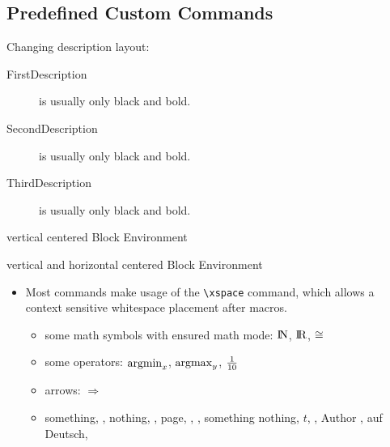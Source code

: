 \documentclass[11pt,a4paper,landscape]{article}
\newcommand*{\nat}{\ensuremath{\rm I\!N}\xspace}
\newcommand*{\rel}{\ensuremath{\rm I\!R}\xspace}
\newcommand*{\argmin}{\ensuremath{\operatornamewithlimits{argmin}}\xspace}
\newcommand*{\argmax}{\ensuremath{\operatornamewithlimits{argmax}}\xspace}
\newcommand*{\congmod}{\ensuremath{\operatornamewithlimits{\cong}}\xspace}
\newcommand*{\invers}{\ensuremath{\frac{1}}\xspace}
\newcommand*{\ra}{\ensuremath{\Rightarrow}\xspace}
\begin{document}
\NewPage\subsection{Predefined Custom Commands}
\begin{block}
Changing description layout:
\begin{description}
  \item[FirstDescription] is usually only black and bold.
  \item[SecondDescription] is usually only black and bold.
  \item[ThirdDescription] is usually only black and bold.
\end{description}
\vfill
\end{block}

\begin{block}
  vertical centered Block Environment
\end{block}

\begin{hvcenter}
  vertical and horizontal centered Block Environment
\end{hvcenter}

\begin{block}
  \begin{itemize}
  \item Most commands make usage of the \texttt{\textbackslash xspace} command, which
    allows a context sensitive whitespace placement after macros.
    \begin{itemize}
    \item some math symbols with ensured math mode: \nat, \rel, \congmod
    \item some operators: $\argmin_{x}$, $\argmax_{y}$, $\invers{10}$
    \item arrows: \ra
    \item \eg something, \Eg, \ie nothing, \Ie, \cf page, \Cf, \etc, something
      \vs nothing, \wrt $t$, \dof, Author \etal, \zB auf Deutsch, \ZB
    \end{itemize}
  \end{itemize}
\end{block}
\end{document}
